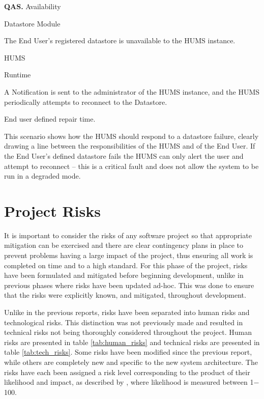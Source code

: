 \documentclass[10pt,a4paper]{article}
\newcommand{\qas}[1]{\textcolor{reqColor}{\textbf{QAS.#1}}}
\newenvironment{scenario}[1]{
\newcommand{\source}[1]{\item[Source of Stimulus:] ##1}
\newcommand{\stimulus}[1]{\item[Stimulus:] ##1}
\newcommand{\artifact}[1]{\item[Artifact:] ##1}
\newcommand{\environment}[1]{\item[Environment:] ##1}
\newcommand{\response}[1]{\item[Response:] ##1}
\newcommand{\measure}[1]{\item[Response Measure:] ##1}
\newcommand{\rationale}[1]{\item[Scenario Rationale:] ##1}
\newcommand{\quality}[1]{\item[Quality:] ##1}
		\begin{description} [noitemsep]	
		\item[Scenario ID:] \qas{#1}
		}{\end{description} \vspace*{0.3cm}
		}
\begin{document}
\begin{scenario}{4}
\quality{Availability}
\source{Datastore Module}
\stimulus{The End User's registered datastore is unavailable to the HUMS instance.}
\artifact{HUMS}
\environment{Runtime}
\response{A Notification is sent to the administrator of the HUMS instance, and the HUMS periodically attempts to reconnect to the Datastore.}
\measure{End user defined repair time.}
\rationale{This scenario shows how the HUMS should respond to a datastore failure, clearly drawing a line between the responsibilities of the HUMS and of the End User. If the End User's defined datastore fails the HUMS can only alert the user and attempt to reconnect -- this is a critical fault and does not allow the system to be run in a degraded mode.}
\end{scenario}

\section{Project Risks}
\label{sec:risks}
It is important to consider the risks of any software project so that appropriate mitigation can be exercised and there are clear contingency plans in place to prevent problems having a large impact of the project, thus ensuring all work is completed on time and to a high standard. For this phase of the project, risks have been formulated and mitigated before beginning development, unlike in previous phases where risks have been updated ad-hoc. This was done to ensure that the risks were explicitly known, and mitigated, throughout development. 

Unlike in the previous reports, risks have been separated into human risks and technological risks. This distinction was not previously made and resulted in technical risks not being thoroughly considered throughout the project. Human risks are presented in table \ref{tab:human_risks} and technical risks are presented in table \ref{tab:tech_risks}.
Some risks have been modified since the previous report, while others are completely new and specific to the new system architecture. The risks have each been assigned a risk level corresponding to the product of their likelihood and impact, as described by \cite{risks}, where likelihood is measured between 1$-$100.
\end{document}
